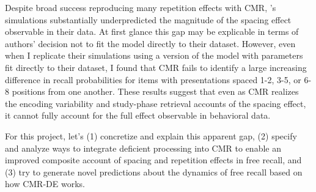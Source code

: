 Despite broad success reproducing many repetition effects with CMR, \citet{siegel2014retrieved}'s simulations substantially underpredicted the magnitude of the spacing effect observable in their data. At first glance this gap may be explicable in terms of authors' decision not to fit the model directly to their dataset. However, even when I replicate their simulations using a version of the model with parameters fit directly to their dataset, I found that CMR fails  to identify a large increasing difference in recall probabilities for items with presentations spaced 1-2, 3-5, or 6-8 positions from one another. These results suggest that even as CMR realizes the encoding variability and study-phase retrieval accounts of the spacing effect, it cannot fully account for the full effect observable in behavioral data.

For this project, let's (1) concretize and explain this apparent gap, (2) specify and analyze ways to integrate deficient processing into CMR to enable an improved composite account of spacing and repetition effects in free recall, and (3) try to generate novel predictions about the dynamics of free recall based on how CMR-DE works.